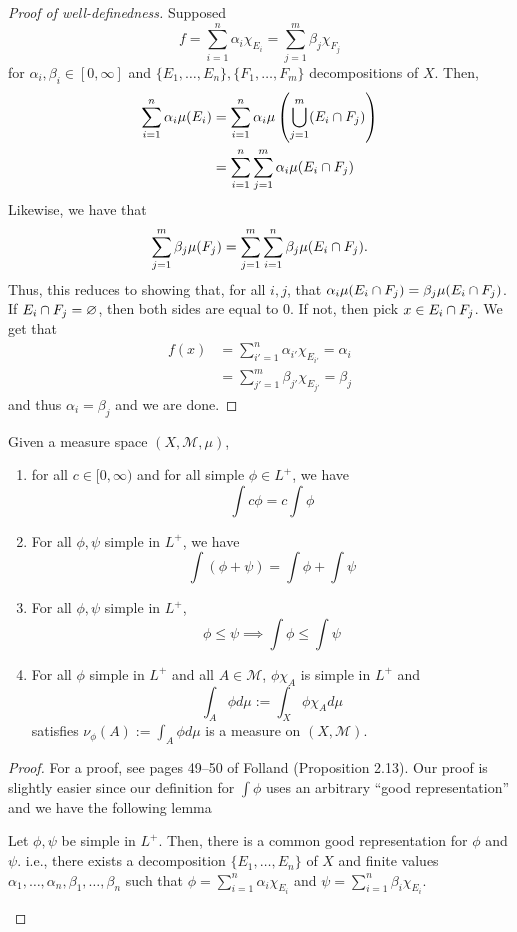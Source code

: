 \documentclass[11pt,leqno,oneside]{amsbook}
\numberwithin{thm}{section}
\newcommand{\M}{\mathcal{M}}
\renewcommand{\emptyset}{\varnothing}
\begin{document}
\begin{proof}[Proof of well-definedness]
  Supposed \[
    f = \sum_{i=1}^n \alpha_i \chi_{E_i} = \sum_{j=1}^m \beta_j \chi_{F_j}
  \]
  for $\alpha_i, \beta_i \in [0,\infty]$ and $\{E_1, \ldots, E_n\},
  \{F_1, \ldots, F_m\}$ decompositions of $X$. Then,
  \begin{align*}
    \sum_{i=1}^n \alpha_i \mu(E_i) & = \sum_{i=1}^n \alpha_i
                                     \mu \left(\bigcup_{j=1}^m (E_i
                                     \cap F_j)\right) \\
    & = \sum_{i=1}^n \sum_{j=1}^m \alpha_i \mu(E_i \cap F_j)
  \end{align*}
  Likewise, we have that \[
    \sum_{j=1}^m \beta_j \mu(F_j) = \sum_{j=1}^m \sum_{i=1}^n \beta_j
    \mu(E_i \cap F_j).
  \]
  Thus, this reduces to showing that, for all $i,j$, that $\alpha_i
  \mu(E_i \cap F_j) = \beta_j \mu(E_i \cap F_j)$. If $E_i
  \intersect F_j = \emptyset$, then both sides are equal to 0. If not,
  then pick $x \in E_i \cap F_j$. We get that
  \begin{align*}
    f(x) & = \sum_{i'=1}^n \alpha_{i'} \chi_{E_{i'}} = \alpha_i \\
    & = \sum_{j'=1}^m \beta_{j'} \chi_{E_{j'}} = \beta_j
  \end{align*}
  and thus $\alpha_i = \beta_j$ and we are done.
\end{proof}
\begin{prop}\label{integration-props}
  Given a measure space $(X,\M,\mu)$,
  \begin{enumerate}
  \item for all $c \in [0,\infty)$ and for all simple $\phi \in L^+$,
    we have \[
      \int c \phi = c \int \phi
    \]
  \item For all $\phi,\psi$ simple in $L^+$, we have \[
      \int (\phi+\psi) = \int \phi + \int \psi
    \]
  \item For all $\phi, \psi$ simple in $L^+$, \[
      \phi \leq \psi \implies \int \phi \leq \int \psi
    \]
  \item For all $\phi$ simple in $L^+$ and all $A \in \M$, $\phi
    \chi_A$ is simple in $L^+$ and \[
      \int_A \phi d \mu := \int_X \phi \chi_A d\mu
    \]
    satisfies $\nu_\phi(A) :=  \int_A \phi d \mu$ is a measure on $(X,\M)$. 
  \end{enumerate}
\end{prop}
\begin{proof}
  For a proof, see pages 49--50 of Folland (Proposition 2.13). Our
  proof is slightly easier since our definition for $\int \phi$ uses
  an arbitrary ``good representation'' and we have the following lemma
  \begin{lem}
    Let $\phi,\psi$ be simple in $L^+$. Then, there is a common good
    representation for $\phi$ and $\psi$. i.e., there exists a
    decomposition $\{E_1, \ldots, E_n\}$ of $X$ and finite values
    $\alpha_1, \ldots, \alpha_n, \beta_1, \ldots, \beta_n$ such that
    $\phi = \sum_{i=1}^n \alpha_i \chi_{E_i}$ and $\psi = \sum_{i=1}^n
    \beta_i \chi_{E_i}$.
  \end{lem}
\end{proof}
\end{document}
